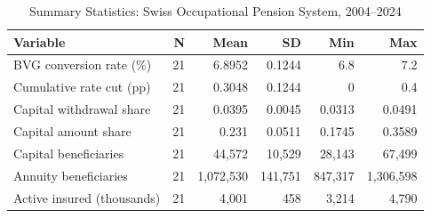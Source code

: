 \begin{table}[htbp]
\centering
\caption{Summary Statistics: Swiss Occupational Pension System, 2004--2024}
\label{tab:summary}
\begin{tabular}{lrrrrr}
\toprule
Variable & N & Mean & SD & Min & Max \\
\midrule
BVG conversion rate (\%) & 21 & 6.8952 & 0.1244 & 6.8 & 7.2 \\
Cumulative rate cut (pp) & 21 & 0.3048 & 0.1244 & 0 & 0.4 \\
Capital withdrawal share & 21 & 0.0395 & 0.0045 & 0.0313 & 0.0491 \\
Capital amount share & 21 & 0.231 & 0.0511 & 0.1745 & 0.3589 \\
Capital beneficiaries & 21 & 44,572 & 10,529 & 28,143 & 67,499 \\
Annuity beneficiaries & 21 & 1,072,530 & 141,751 & 847,317 & 1,306,598 \\
Active insured (thousands) & 21 & 4,001 & 458 & 3,214 & 4,790 \\
\bottomrule
\end{tabular}

\par{}

\end{table}

